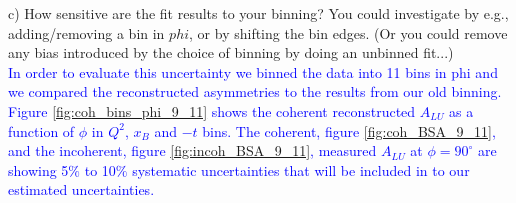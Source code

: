   c) How sensitive are the fit results to your binning? You could investigate 
by e.g., adding/removing a bin in $phi$, or  by shifting the bin edges. (Or you 
could remove any bias introduced by the choice of binning by doing an unbinned 
fit...)\\
\textcolor{blue}{ In order to evaluate this uncertainty we binned the data into 
   11 bins in phi and we compared the reconstructed asymmetries to the results 
from our old binning.  Figure \ref{fig:coh_bins_phi_9_11} shows the coherent 
reconstructed $A_{LU}$ as a function of $\phi$ in $Q^{2}$, $x_B$ and $-t$ bins.  
The coherent, figure \ref{fig:coh_BSA_9_11}, and the incoherent, figure 
\ref{fig:incoh_BSA_9_11}, measured $A_{LU}$ at $\phi = 90 ^{\circ}$ are showing 
5$\%$ to 10$\%$ systematic uncertainties that will be included in to our 
estimated uncertainties. }\\
